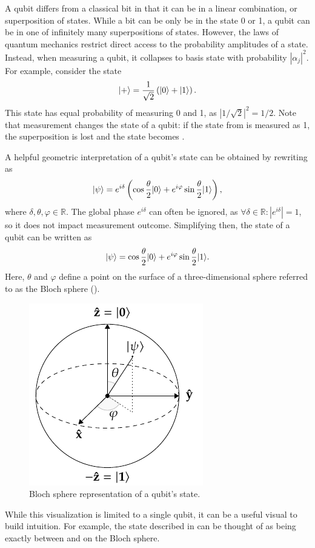 A qubit differs from a classical bit in that it can be in a linear combination, or superposition of states.
While a bit can be only be in the state 0 or 1, a qubit can be in one of infinitely many superpositions of states.
However, the laws of quantum mechanics restrict direct access to the probability amplitudes of a state.
Instead, when measuring a qubit, it collapses to basis state  with probability $|\alpha_j|^2$.
For example, consider the state
\begin{equation} \label{eqn:plus-state}
\vert{+}\rangle = \dfrac{1}{\sqrt{2}}\left(\vert{0}\rangle + \vert{1}\rangle\right).
\end{equation}
This state has equal probability of measuring 0 and 1, as $|1/\sqrt{2}|^2 = 1/2$.
Note that measurement changes the state of a qubit: if the state from  is measured as 1, the superposition is lost and the state becomes .

A helpful geometric interpretation of a qubit's state can be obtained by rewriting  as
\begin{equation}
\vert{\psi}\rangle = e^{i\delta} \left(\cos\dfrac{\theta}{2}\vert{0}\rangle + e^{i\varphi}\sin\dfrac{\theta}{2}\vert{1}\rangle\right),
\end{equation}
where $\delta, \theta, \varphi \in \mathbb{R}$.
The global phase $e^{i\delta}$ can often be ignored, as $\forall \delta \in \mathbb{R} : |e^{i\delta}| = 1$, so it does not impact measurement outcome.
Simplifying then, the state of a qubit can be written as
\begin{equation}
\vert{\psi}\rangle = \cos\dfrac{\theta}{2}\vert{0}\rangle + e^{i\varphi}\sin\dfrac{\theta}{2}\vert{1}\rangle.
\end{equation}
Here, $\theta$ and $\varphi$ define a point on the surface of a three-dimensional sphere referred to as the Bloch sphere ().
\begin{figure}[ht]
    \centering
    \includegraphics[width=0.33\linewidth]{figures/bloch-sphere.pdf}
    \caption[Bloch sphere representation of a qubit's state.]{
        Bloch sphere representation of a qubit's state.
    }
    \label{fig:bloch-sphere}
\end{figure}
While this visualization is limited to a single qubit, it can be a useful visual to build intuition.
For example, the \ket{+} state described in  can be thought of as being exactly between  and  on the Bloch sphere.

